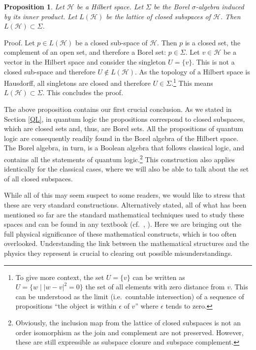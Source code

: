 \documentclass[11pt, executivepaper]{article}
\newtheorem{prop}{Proposition}
\begin{document}
\begin{prop}
	Let $\mathcal{H}$ be a Hilbert space. Let $\Sigma$ be the Borel $\sigma$-algebra induced by its inner product. Let $L(\mathcal{H})$ be the lattice of closed subspaces of $\mathcal{H}$. Then $L(\mathcal{H}) \subset \Sigma$.
\end{prop}

Proof. Let $p \in L(\mathcal{H})$ be a closed sub-space of $\mathcal{H}$. Then $p$ is a closed set, the complement of an open set, and therefore a Borel set: $p \in \Sigma$. Let $v \in \mathcal{H}$ be a vector in the Hilbert space and consider the singleton $U = \{ v \}$. This is not a closed sub-space and therefore $U \notin L(\mathcal{H})$. As the topology of a Hilbert space is Hausdorff, all singletons are closed and therefore $U \in \Sigma$.\footnote{To give more context, the set $U = \{ v \}$ can be written as $U = \{w \; | \; |w - v|^2 = 0\}$ the set of all elements with zero distance from $v$. This can be understood as the limit (i.e.\ countable intersection) of a sequence of propositions ``the object is within $\epsilon$ of $v$'' where $\epsilon$ tends to zero.} This means $L(\mathcal{H}) \subset \Sigma$. This concludes the proof.

The above proposition contains our first crucial conclusion. As we stated in Section \ref{QL}, in quantum logic the propositions correspond to closed subspaces, which are closed sets and, thus, are Borel sets. All the propositions of quantum logic are consequently readily found in the Borel algebra of the Hilbert space. The Borel algebra, in turn, is a Boolean algebra that follows classical logic, and contains all the statements of quantum logic.\footnote{Obviously, the inclusion map from the lattice of closed subspaces is not an order isomorphism as the join and complement are not preserved. However, these are still expressible as subspace closure and subspace complement.} This construction also applies identically for the classical cases, where we will also be able to talk about the set of all closed subspaces.

While all of this may seem suspect to some readers, we would like to stress that these are very standard constructions. Alternatively stated, all of what has been mentioned so far are the standard mathematical techniques used to study these spaces and can be found in any textbook (cf.\ \cite{Rudin:1991}, \cite{Vasudeva:2017}). Here we are bringing out the full physical significance of these mathematical constructs, which is too often overlooked. Understanding the link between the mathematical structures and the physics they represent is crucial to clearing out possible misunderstandings.
\end{document}
